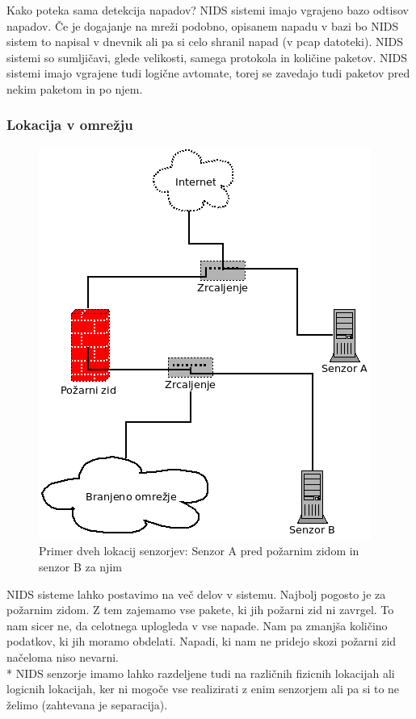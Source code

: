 \documentclass[12pt]{article}
\begin{document}
Kako poteka sama detekcija napadov? 
NIDS sistemi imajo vgrajeno bazo odtisov napadov. Če je dogajanje na mreži podobno, opisanem napadu v bazi
bo NIDS sistem to napisal v dnevnik ali pa si celo shranil napad (v pcap datoteki). 
NIDS sistemi so sumljičavi, glede velikosti, samega protokola in količine paketov.
NIDS sistemi imajo vgrajene tudi logične avtomate, torej se zavedajo tudi paketov pred nekim paketom in po njem.


\subsubsection{Lokacija v omrežju} %

\begin{figure}[htb]
\begin{center}
\includegraphics[scale=0.5]{pozicija.png}
\end{center}
\caption{Primer dveh lokacij senzorjev: Senzor A pred požarnim zidom in senzor B za njim}
\label{pozicija}
\end{figure}

NIDS sisteme lahko postavimo na več delov v sistemu. Najbolj pogosto je za požarnim zidom.
Z tem zajemamo vse pakete, ki jih požarni zid ni zavrgel. To nam sicer ne, da celotnega uplogleda v vse napade.
Nam pa zmanjša količino podatkov, ki jih moramo obdelati. Napadi, ki nam ne pridejo skozi požarni zid načeloma niso nevarni.
\\*
NIDS senzorje imamo lahko razdeljene tudi na različnih fizicnih lokacijah ali logicnih lokacijah, ker ni mogoče vse realizirati z enim senzorjem ali pa si to ne želimo (zahtevana je separacija).
\end{document}
